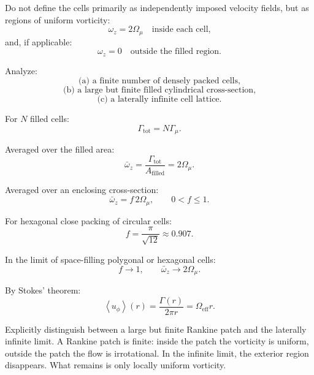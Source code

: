 \documentclass[11pt]{article}
\begin{document}
            Do not define the cells primarily as independently imposed velocity fields, but as regions of uniform vorticity:
            \[
                \omega_z = 2\Omega_{\mu}
                \quad \text{inside each cell,}
            \]
            and, if applicable:
            \[
                \omega_z = 0
                \quad \text{outside the filled region.}
            \]
            
            Analyze:
            \[
                \text{(a) a finite number of densely packed cells,}
            \]
            \[
                \text{(b) a large but finite filled cylindrical cross-section,}
            \]
            \[
                \text{(c) a laterally infinite cell lattice.}
            \]
            
            For \(N\) filled cells:
            \[
                \Gamma_{\mathrm{tot}}=N\Gamma_{\mu}.
            \]
            
            Averaged over the filled area:
            \[
                \bar{\omega}_z
                =
                \frac{\Gamma_{\mathrm{tot}}}{A_{\mathrm{filled}}}
                =
                2\Omega_{\mu}.
            \]
            
            Averaged over an enclosing cross-section:
            \[
                \bar{\omega}_z=f\,2\Omega_{\mu},
                \qquad
                0<f\leq1.
            \]
            
            For hexagonal close packing of circular cells:
            \[
                f=\frac{\pi}{\sqrt{12}}\approx0.907.
            \]
            
            In the limit of space-filling polygonal or hexagonal cells:
            \[
                f\rightarrow1,
                \qquad
                \bar{\omega}_z\rightarrow2\Omega_{\mu}.
            \]
            
            By Stokes' theorem:
            \[
                \left\langle u_{\phi}\right\rangle(r)
                =
                \frac{\Gamma(r)}{2\pi r}
                =
                \Omega_{\mathrm{eff}}r.
            \]
            
            Explicitly distinguish between a large but finite Rankine patch and the laterally infinite limit. A Rankine patch is finite: inside the patch the vorticity is uniform, outside the patch the flow is irrotational. In the infinite limit, the exterior region disappears. What remains is only locally uniform vorticity.
            
\end{document}
